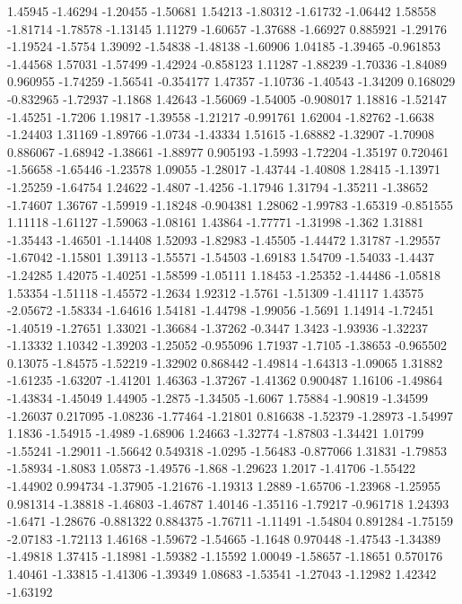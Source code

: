 \documentclass[9pt]{article}
\theoremstyle{plain}
\theoremstyle{definition}
\theoremstyle{remark}
\numberwithin{equation}{section}
\begin{document}
1.45945
-1.46294
-1.20455
-1.50681
1.54213
-1.80312
-1.61732
-1.06442
1.58558
-1.81714
-1.78578
-1.13145
1.11279
-1.60657
-1.37688
-1.66927
0.885921
-1.29176
-1.19524
-1.5754
1.39092
-1.54838
-1.48138
-1.60906
1.04185
-1.39465
-0.961853
-1.44568
1.57031
-1.57499
-1.42924
-0.858123
1.11287
-1.88239
-1.70336
-1.84089
0.960955
-1.74259
-1.56541
-0.354177
1.47357
-1.10736
-1.40543
-1.34209
0.168029
-0.832965
-1.72937
-1.1868
1.42643
-1.56069
-1.54005
-0.908017
1.18816
-1.52147
-1.45251
-1.7206
1.19817
-1.39558
-1.21217
-0.991761
1.62004
-1.82762
-1.6638
-1.24403
1.31169
-1.89766
-1.0734
-1.43334
1.51615
-1.68882
-1.32907
-1.70908
0.886067
-1.68942
-1.38661
-1.88977
0.905193
-1.5993
-1.72204
-1.35197
0.720461
-1.56658
-1.65446
-1.23578
1.09055
-1.28017
-1.43744
-1.40808
1.28415
-1.13971
-1.25259
-1.64754
1.24622
-1.4807
-1.4256
-1.17946
1.31794
-1.35211
-1.38652
-1.74607
1.36767
-1.59919
-1.18248
-0.904381
1.28062
-1.99783
-1.65319
-0.851555
1.11118
-1.61127
-1.59063
-1.08161
1.43864
-1.77771
-1.31998
-1.362
1.31881
-1.35443
-1.46501
-1.14408
1.52093
-1.82983
-1.45505
-1.44472
1.31787
-1.29557
-1.67042
-1.15801
1.39113
-1.55571
-1.54503
-1.69183
1.54709
-1.54033
-1.4437
-1.24285
1.42075
-1.40251
-1.58599
-1.05111
1.18453
-1.25352
-1.44486
-1.05818
1.53354
-1.51118
-1.45572
-1.2634
1.92312
-1.5761
-1.51309
-1.41117
1.43575
-2.05672
-1.58334
-1.64616
1.54181
-1.44798
-1.99056
-1.5691
1.14914
-1.72451
-1.40519
-1.27651
1.33021
-1.36684
-1.37262
-0.3447
1.3423
-1.93936
-1.32237
-1.13332
1.10342
-1.39203
-1.25052
-0.955096
1.71937
-1.7105
-1.38653
-0.965502
0.13075
-1.84575
-1.52219
-1.32902
0.868442
-1.49814
-1.64313
-1.09065
1.31882
-1.61235
-1.63207
-1.41201
1.46363
-1.37267
-1.41362
0.900487
1.16106
-1.49864
-1.43834
-1.45049
1.44905
-1.2875
-1.34505
-1.6067
1.75884
-1.90819
-1.34599
-1.26037
0.217095
-1.08236
-1.77464
-1.21801
0.816638
-1.52379
-1.28973
-1.54997
1.1836
-1.54915
-1.4989
-1.68906
1.24663
-1.32774
-1.87803
-1.34421
1.01799
-1.55241
-1.29011
-1.56642
0.549318
-1.0295
-1.56483
-0.877066
1.31831
-1.79853
-1.58934
-1.8083
1.05873
-1.49576
-1.868
-1.29623
1.2017
-1.41706
-1.55422
-1.44902
0.994734
-1.37905
-1.21676
-1.19313
1.2889
-1.65706
-1.23968
-1.25955
0.981314
-1.38818
-1.46803
-1.46787
1.40146
-1.35116
-1.79217
-0.961718
1.24393
-1.6471
-1.28676
-0.881322
0.884375
-1.76711
-1.11491
-1.54804
0.891284
-1.75159
-2.07183
-1.72113
1.46168
-1.59672
-1.54665
-1.1648
0.970448
-1.47543
-1.34389
-1.49818
1.37415
-1.18981
-1.59382
-1.15592
1.00049
-1.58657
-1.18651
0.570176
1.40461
-1.33815
-1.41306
-1.39349
1.08683
-1.53541
-1.27043
-1.12982
1.42342
-1.63192
\end{document}
